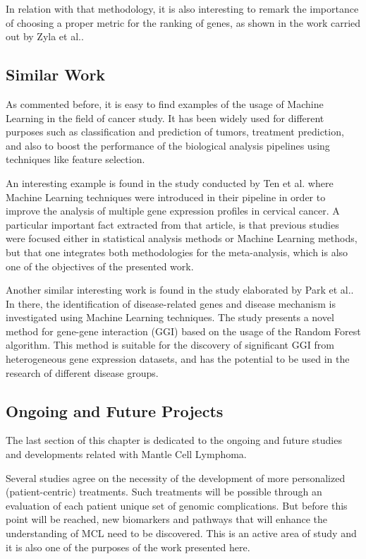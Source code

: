 In relation with that methodology, it is also interesting to remark the importance of choosing a proper metric for the ranking of genes, as shown in the work carried out by Zyla et al.\cite{Zyla2017}.

\subsection{Similar Work}

As commented before, it is easy to find examples of the usage of Machine Learning in the field of cancer study. It has been widely used for different purposes such as classification\cite{Chuang2007} and prediction of tumors, treatment prediction, and also to boost the performance of the biological analysis pipelines using techniques like feature selection\cite{SINGH201552}\cite{Bashiri2017}.


An interesting example is found in the study conducted by Ten et al.\cite{Tan2018} where Machine Learning techniques were introduced in their pipeline in order to improve the analysis of multiple gene expression profiles in cervical cancer.
A particular important fact extracted from that article, is that previous studies were focused either in statistical analysis methods or Machine Learning methods, but that one integrates both methodologies for the meta-analysis, which is also one of the objectives of the presented work.

Another similar interesting work is found in the study elaborated by Park et al.\cite{Park2018}. In there, the identification of disease-related genes and disease mechanism is investigated using Machine Learning techniques. The study presents a novel method for gene-gene interaction (GGI) based on the usage of the Random Forest algorithm. This method is suitable for the discovery of significant GGI from heterogeneous gene expression datasets, and has the potential to be used in the research of different disease groups.

\subsection{Ongoing and Future Projects}

The last section of this chapter is dedicated to the ongoing and future studies and developments related with Mantle Cell Lymphoma.

Several studies\cite{Steiner2018}\cite{Schieber2018}\cite{Dreyling2016} agree on the necessity of the development of more personalized (patient-centric) treatments. Such treatments will be possible through an evaluation of each patient unique set of genomic complications. But before this point will be reached, new biomarkers and pathways that will enhance the understanding of MCL need to be discovered. This is an active area of study and it is also one of the purposes of the work presented here.